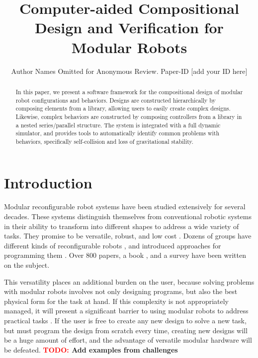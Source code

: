 \documentclass[conference]{IEEEtran}
\theoremstyle{definition}
\newcommand{\TODO}[1]{ {\bf \textcolor{red}{TODO:} #1 }}
\begin{document}
\title{Computer-aided Compositional Design and Verification for Modular Robots}

\author{Author Names Omitted for Anonymous Review. Paper-ID [add your ID here]}

\maketitle

\begin{abstract}
In this paper, we present a software framework for the compositional design of
modular robot configurations and behaviors. Designs are constructed
hierarchically by composing elements from a library, allowing users to easily
create complex designs.  Likewise, complex behaviors are constructed by
composing controllers from a library in a nested series/parallel structure. The
system is integrated with a full dynamic simulator, and provides tools to automatically
identify common problems with behaviors, specifically self-collision and loss
of gravitational stability.

\end{abstract}

\section{Introduction}
Modular reconfigurable robot systems have been studied extensively for several
decades.  These systems distinguish themselves from conventional robotic systems in their
ability to transform into different shapes to address a wide variety of tasks. They
promise to be versatile, robust, and low cost \cite{yim2000polybot}. Dozens of groups
have different kinds of reconfigurable robots \cite{fukuda1990cellular, lipson2000towards}, and introduced approaches
for programming them \cite{salemi2001hormone, walter2002choosing, melek2003neurofuzzy}.  Over 800 papers, a book \cite{stoy2010book}, and a survey \cite{yim2007modular}
have been written on the subject.

This versatility places an additional burden on the user, because
solving problems with modular robots involves not only designing  programs,
but also the best physical form for the task at hand. If this
complexity is not appropriately managed, it will present a significant barrier to
using modular robots to address practical tasks \cite{yim2000modular}. If the user is free to create any new design to
solve a new task, but must program the design from scratch every time, creating
new designs will be a huge amount of effort, and the advantage of versatile modular
hardware will be defeated. \TODO{Add examples from challenges}
\end{document}
